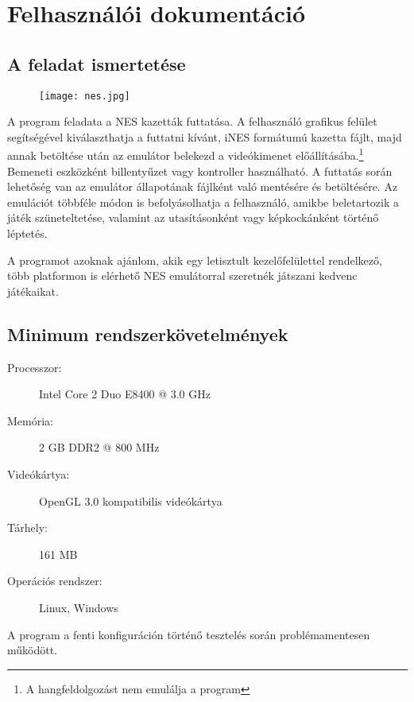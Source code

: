\chapter{Felhasználói dokumentáció} %
\label{ch:user}

\section{A feladat ismertetése}

\begin{figure}[H]
	\centering
	\texttt{[image: nes.jpg]}
	\label{fig:nes}
\end{figure}

A program feladata a NES kazetták futtatása. A felhasználó grafikus felület segítségével kiválaszthatja a futtatni kívánt, iNES formátumú kazetta fájlt, majd annak betöltése után az emulátor belekezd a videókimenet előállításába.\footnote{A hangfeldolgozást nem emulálja a program} Bemeneti eszközként billentyűzet vagy kontroller használható. A futtatás során lehetőség van az emulátor állapotának fájlként való mentésére és betöltésére. Az emulációt többféle módon is befolyásolhatja a felhasználó, amikbe beletartozik a játék szüneteltetése, valamint az utasításonként vagy képkockánként történő léptetés.

A programot azoknak ajánlom, akik egy letisztult kezelőfelülettel rendelkező, több platformon is elérhető NES emulátorral szeretnék játszani kedvenc játékaikat.

\section{Minimum rendszerkövetelmények}

\begin{description}
	\item[Processzor:] Intel Core 2 Duo E8400 @ 3.0 GHz
	\item[Memória:] 2 GB DDR2 @ 800 MHz
	\item[Videókártya:] OpenGL 3.0 kompatibilis videókártya
	\item[Tárhely:] 161 MB
	\item[Operációs rendszer:] Linux, Windows
\end{description}

A program a fenti konfiguráción történő tesztelés során problémamentesen működött.

